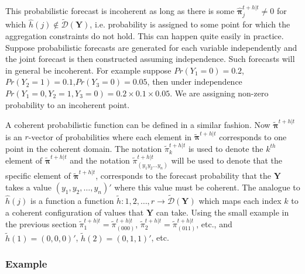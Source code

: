 \documentclass[a4paper,review,12pt,authoryear]{elsarticle}
\newcommand{\bY}{\mathbf{Y}}
\newcommand{\bpi}{\bm{\pi}}
\begin{document}
    This probabilistic forecast is incoherent as long as there is some $\hat{\bpi}^{t+h|t}_j\neq 0$ for which $\hat{h}(j)\notin\tilde{\mathcal{D}}(\bY)$, i.e. probability is assigned to some point for which the aggregation constraints do not hold. This can happen quite easily in practice. Suppose probabilistic forecasts are generated for each variable independently and the joint forecast is then constructed assuming independence. Such forecasts will in general be incoherent. For example suppose $Pr(Y_1=0)=0.2$,$Pr(Y_2=1)=0.1$,$Pr(Y_3=0)=0.05$, then under independence $Pr(Y_1=0,Y_2=1,Y_3=0)=0.2\times0.1\times0.05$. We are assigning non-zero probability to an incoherent point.
    
    A coherent probabilistic function can be defined in a similar fashion. Now $\tilde{\bpi}^{t+h|t}$ is an $r$-vector of probabilities where each element in $\tilde{\bpi}^{t+h|t}$ corresponds to one point in the coherent domain. The notation $\tilde{\pi}_k^{t+h|t}$ is used to denote the $k^{th}$ element of $\tilde{\bpi}^{t+h|t}$ and the notation $\tilde{\pi}_{(y_1 y_2 \dots y_n)}^{t+h|t}$ will be used to denote that the specific element of $\tilde{\bpi}^{t+h|t}$, corresponds to the forecast probability that the $\bY$ takes a value $(y_1,y_2,\dots,y_n)'$ where this value must be coherent. The analogue to $\hat{h}(j)$ is a function a function $\tilde{h}:{1,2,\dots,r}\rightarrow\tilde{\mathcal{D}}(\bY)$ which maps each index $k$ to a coherent configuration of values that $\bY$ can take. Using the small example in the previous section $\tilde{\pi}_1^{t+h|t}=\tilde{\pi}_{(000)}^{t+h|t}$, $\tilde{\pi}_2^{t+h|t}=\tilde{\pi}_{(011)}^{t+h|t}$, etc., and $\tilde{h}(1)=(0,0,0)'$, $\tilde{h}(2)=(0,1,1)'$, etc.
    
    \subsubsection*{Example}
    
\end{document}
